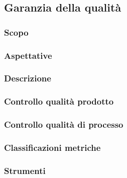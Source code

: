 \subsection{Garanzia della qualità}

	\subsubsection{Scopo}
	\subsubsection{Aspettative}
	\subsubsection{Descrizione}
	\subsubsection{Controllo qualità prodotto}
	\subsubsection{Controllo qualità di processo}
	\subsubsection{Classificazioni metriche}
	\subsubsection{Strumenti}
	
